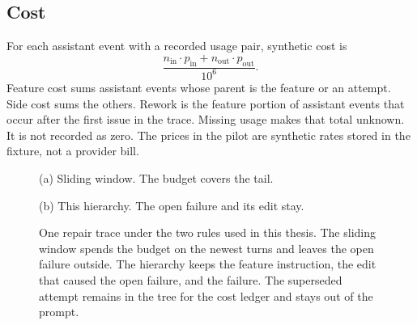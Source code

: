 \documentclass[11pt]{article}
\begin{document}
\subsection{Cost}

For each assistant event with a recorded usage pair, synthetic cost is
\[
\frac{n_{\mathrm{in}}\cdot p_{\mathrm{in}} + n_{\mathrm{out}}\cdot p_{\mathrm{out}}}{10^{6}}.
\]
Feature cost sums assistant events whose parent is the feature or an attempt.
Side cost sums the others.
Rework is the feature portion of assistant events that occur after the first issue in the trace.
Missing usage makes that total unknown.
It is not recorded as zero.
The prices in the pilot are synthetic rates stored in the fixture, not a provider bill.

\begin{figure}[t]
\centering
\begin{minipage}[t]{0.46\textwidth}
\centering
{}

\vspace{2mm}
{\small (a) Sliding window. The budget covers the tail.}
\end{minipage}\hfill
\begin{minipage}[t]{0.50\textwidth}
\centering
{}

\vspace{2mm}
{\small (b) This hierarchy. The open failure and its edit stay.}
\end{minipage}
\caption{One repair trace under the two rules used in this thesis.
The sliding window spends the budget on the newest turns and leaves the open failure outside.
The hierarchy keeps the feature instruction, the edit that caused the open failure, and the failure.
The superseded attempt remains in the tree for the cost ledger and stays out of the prompt.}
\label{fig:contrast}
\end{figure}
\end{document}
